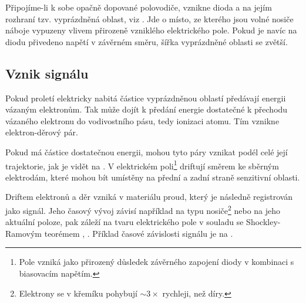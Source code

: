 Připojíme-li k sobe opačně dopované polovodiče, vznikne dioda a na jejím rozhraní tzv. vyprázdněná oblast, viz . Jde o místo, ze kterého jsou volné nosiče náboje vypuzeny vlivem přirozeně vzniklého elektrického pole. Pokud je navíc na diodu přivedeno napětí v závěrném směru, šířka vyprázdněné oblasti se zvětší.



\subsection{Vznik signálu}

Pokud proletí elektricky nabitá částice vyprázdněnou oblastí předávají energii vázaným elektronům. Tak může dojít k předání energie dostatečné k přechodu vázaného elektronu do vodivostního pásu, tedy ionizaci atomu. Tím vznikne elektron-děrový pár.

Pokud má částice dostatečnou energii, mohou tyto páry vznikat podél celé její trajektorie, jak je vidět na . V elektrickém poli\footnote{Pole vzniká jako přirozený důsledek závěrného zapojení diody v kombinaci s biasovacím napětím.} driftují směrem ke sběrným elektrodám, které mohou bít umístěny na přední a zadní straně senzitivní oblasti.

Driftem elektronů a děr vzniká v materiálu proud, který je následně registrován jako signál. Jeho časový vývoj závisí například na typu nosiče\footnote{Elektrony se v křemíku pohybují $\sim 3 \times$ rychleji, než díry.} nebo na jeho aktuální poloze, pak záleží na tvaru elektrického pole v souladu se Shockley-Ramovým teorémem \cite{ramo1939}, \cite{shockley1938}. Příklad časové závislosti signálu je na .

